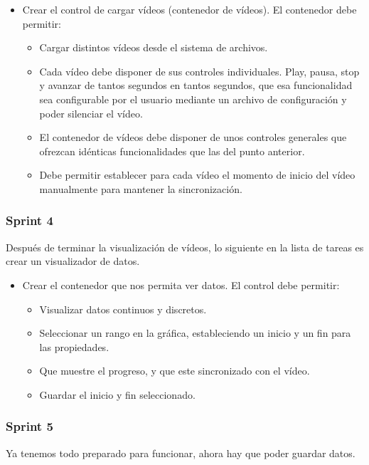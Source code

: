 \begin{itemize}
    \item Crear el control de cargar v\'{i}deos (contenedor de v\'{i}deos). El contenedor debe 
    permitir:
    \begin{itemize}
        \item Cargar distintos v\'{i}deos desde el sistema de archivos.
        \item Cada v\'{i}deo debe disponer de sus controles individuales. Play, pausa, stop y 
        avanzar de tantos segundos en tantos 
        segundos, que esa funcionalidad sea configurable por el usuario mediante un archivo
        de configuraci\'on y poder silenciar el v\'ideo.
        \item El contenedor de v\'{i}deos debe disponer de unos controles generales que ofrezcan 
        id\'enticas funcionalidades
        que las del punto anterior.
        \item Debe permitir establecer para cada v\'{i}deo el momento de inicio del v\'{i}deo 
        manualmente para mantener la 
        sincronizaci\'{o}n.
    \end{itemize}
\end{itemize}

\subsubsection{Sprint 4}
Despu\'{e}s de terminar la visualizaci\'{o}n de v\'{i}deos, lo siguiente en la lista de tareas es 
crear un visualizador de datos.

\begin{itemize}
    \item Crear el contenedor que nos permita ver datos. El control debe permitir:
    \begin{itemize}
        \item Visualizar datos continuos y discretos.
        \item Seleccionar un rango en la gr\'{a}fica, estableciendo un inicio y un fin para las 
        propiedades.
        \item Que muestre el progreso, y que este sincronizado con el v\'{i}deo.
        \item Guardar el inicio y fin seleccionado.
    \end{itemize}
\end{itemize}

\subsubsection{Sprint 5}
Ya tenemos todo preparado para funcionar, ahora hay que poder guardar datos.

